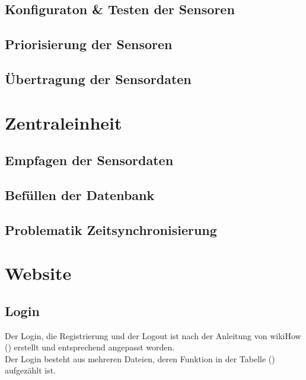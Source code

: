 \subsection{Konfiguraton \& Testen der Sensoren}
\subsection{Priorisierung der Sensoren}
\subsection{Übertragung der Sensordaten}

\section{Zentraleinheit}%
\subsection{Empfagen der Sensordaten}
\subsection{Befüllen der Datenbank}
\subsection{Problematik Zeitsynchronisierung}
 
\section{Website}
\subsection{Login}

Der Login, die Registrierung und der Logout ist nach der Anleitung von
wikiHow (\cite{PHP-Login}) erstellt und entsprechend angepasst worden. 
\\
Der Login besteht aus mehreren Dateien, deren Funktion in der Tabelle
() aufgezählt ist.

